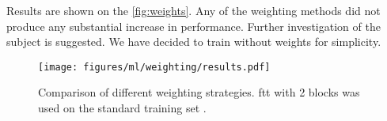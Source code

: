Results are shown on the \autoref{fig:weights}. Any of the weighting methods did not produce any substantial increase in
performance. Further investigation of the subject is suggested. We have decided to train without weights for simplicity.

\begin{figure}[htb]
      \centering
      \texttt{[image: figures/ml/weighting/results.pdf]}
      \caption[Comparison of different weighting strategies.]
      {Comparison of different weighting strategies. \gls{ftt} with 2 blocks was used on the standard training set
            \ttrn.
            \transplot
      }
      \label{fig:weights}
\end{figure}

\clearpage
